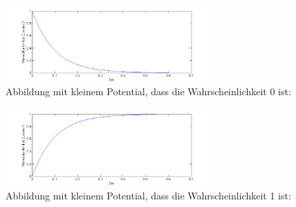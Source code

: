 \begin{refsection}
\begin{figure}
\centering
\includegraphics[width=0.7\textwidth]{flash/graphics/PotentialkleinZ0.png}
\caption{Abbildung mit kleinem Potential, dass die Wahrscheinlichkeit 0 ist:
\label{skript:PotentialkleinZ0}}
\end{figure}
\begin{figure}
\centering
\includegraphics[width=0.7\textwidth]{flash/graphics/PotentialkleinZ1.png}
\caption{Abbildung mit kleinem Potential, dass die Wahrscheinlichkeit 1 ist:
\label{skript:PotentialkleinZ1}}
\end{figure}

\printbibliography[heading=subbibliography]
\end{refsection}

